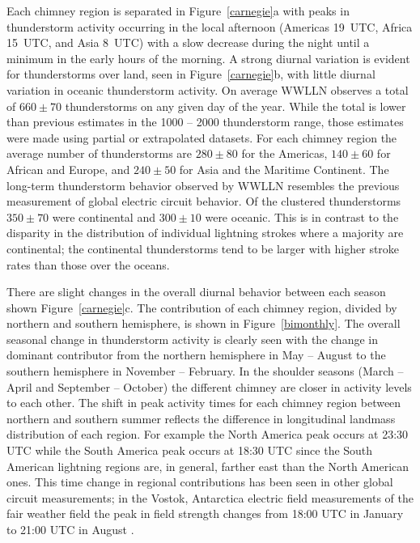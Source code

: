 Each chimney region is separated in Figure~\ref{carnegie}a with peaks in thunderstorm activity occurring in the local afternoon (Americas 19~UTC, Africa 15~UTC, and Asia 8~UTC) with a slow decrease during the night until a minimum in the early hours of the morning.
A strong diurnal variation is evident for thunderstorms over land, seen in Figure~\ref{carnegie}b, with  little diurnal variation in oceanic thunderstorm activity.
On average WWLLN observes a total of $660 \pm 70$ thunderstorms on any given day of the year.
While the total is lower than previous estimates in the 1000 -- 2000 thunderstorm range, those estimates were made using partial or extrapolated datasets.
For each chimney region the average number of thunderstorms are $280 \pm 80$ for the Americas, $140 \pm 60$ for African and Europe, and $240 \pm 50$ for Asia and the Maritime Continent.
The long-term thunderstorm behavior observed by WWLLN resembles the previous measurement of global electric circuit behavior.
Of the clustered thunderstorms $350 \pm 70$ were continental and $300 \pm 10$ were oceanic.
This is in contrast to the disparity in the distribution of individual lightning strokes where a majority are continental; the continental thunderstorms tend to be larger with higher stroke rates than those over the oceans.

There are slight changes in the overall diurnal behavior between each season shown Figure~\ref{carnegie}c.
The contribution of each chimney region, divided by northern and southern hemisphere, is shown in Figure~\ref{bimonthly}.
The overall seasonal change in thunderstorm activity is clearly seen with the change in dominant contributor from the northern hemisphere in May -- August to the southern hemisphere in November -- February.
In the shoulder seasons (March -- April and September -- October) the different chimney are closer in activity levels to each other.
The shift in peak activity times for each chimney region between northern and southern summer reflects the difference in longitudinal landmass distribution of each region.
For example the North America peak occurs at 23:30 UTC while the South America peak occurs at 18:30 UTC since the South American lightning regions are, in general, farther east than the North American ones.
This time change in regional contributions has been seen in other global circuit measurements; in the Vostok, Antarctica electric field measurements of the fair weather field the peak in field strength changes from 18:00 UTC in January to 21:00 UTC in August \citep{Burns2005, Burns2012}.

